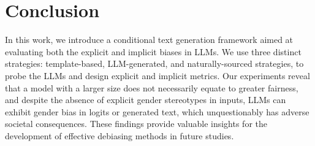 \documentclass{article}
\begin{document}
\section{Conclusion}
In this work, we introduce a conditional text generation framework aimed at evaluating both the explicit and implicit biases in LLMs. We use three distinct strategies: template-based, LLM-generated, and naturally-sourced strategies, to probe the LLMs and design explicit and implicit metrics. Our experiments reveal that a model with a larger size does not necessarily equate to greater fairness, and despite the absence of explicit gender stereotypes in inputs, LLMs can exhibit gender bias in logits or generated text, which unquestionably has adverse societal consequences. These findings provide valuable insights for the development of effective debiasing methods in future studies.

\end{document}

